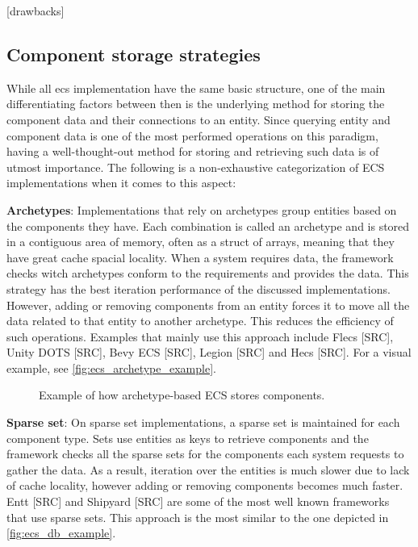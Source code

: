 \documentclass[twoside, 11pt]{article}
\begin{document}
[drawbacks]

\subsection{Component storage strategies}

While all \gls{ecs} implementation have the same basic structure, one of the main differentiating factors between then is the underlying method for storing the component data and their connections to an entity. Since querying entity and component data is one of the most performed operations on this paradigm, having a well-thought-out method for storing and retrieving such data is of utmost importance. The following is a non-exhaustive categorization of ECS implementations when it comes to this aspect:

\textbf{Archetypes}: Implementations that rely on archetypes group entities based on the components they have. Each combination is called an archetype and is stored in a contiguous area of memory, often as a struct of arrays, meaning that they have great cache spacial locality. When a system requires data, the framework checks witch archetypes conform to the requirements and provides the data. This strategy has the best iteration performance of the discussed implementations. However, adding or removing components from an entity forces it to move all the data related to that entity to another archetype. This reduces the efficiency of such operations. Examples that mainly use this approach include Flecs [SRC], Unity DOTS [SRC], Bevy ECS [SRC], Legion [SRC] and Hecs [SRC]. For a visual example, see \autoref{fig:ecs_archetype_example}.

\begin{figure}
  \centering
  
  \caption{Example of how archetype-based ECS stores components.}
  \label{fig:ecs_archetype_example}
\end{figure}

\textbf{Sparse set}: On sparse set implementations, a sparse set is maintained for each component type. Sets use entities as keys to retrieve components and the framework checks all the sparse sets for the components each system requests to gather the data. As a result, iteration over the entities is much slower due to lack of cache locality, however adding or removing components becomes much faster. Entt [SRC] and Shipyard [SRC] are some of the most well known frameworks that use sparse sets. This approach is the most similar to the one depicted in \autoref{fig:ecs_db_example}.
\end{document}
